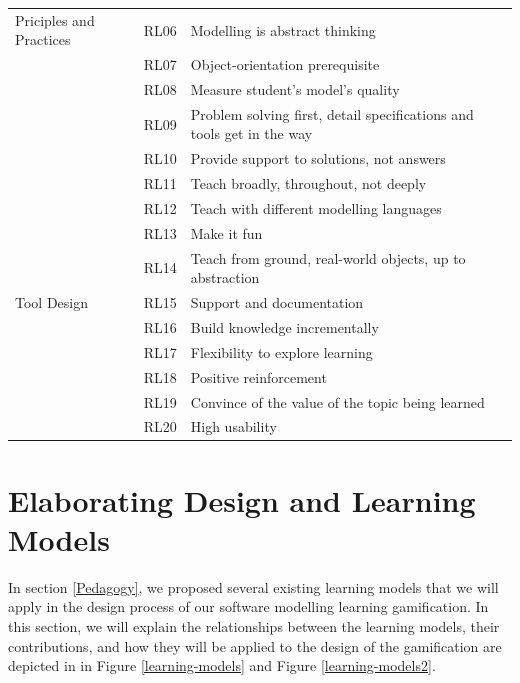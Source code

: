 \documentclass[12pt, a4paper]{report}
\begin{document}
{\begin{table}[ht]
\begin{center}
\begin{tabular}{ p{2cm}p{1cm}p{10cm} }
\hline
\multirow{1}{2cm}{Priciples and Practices} 
& RL06 & Modelling is abstract thinking \\ 
& RL07 & Object-orientation prerequisite \\
& RL08 & Measure student's model's quality \\
& RL09 & Problem solving first, detail specifications and tools get in the way \\
& RL10 & Provide support to solutions, not answers \\ 
& RL11 & Teach broadly, throughout, not deeply \\
& RL12 & Teach with different modelling languages \\ 
& RL13 & Make it fun \\ 
& RL14 & Teach from ground, real-world objects, up to abstraction \\ 

\hline
\multirow{1}{2cm}{Tool Design}
& RL15 & Support and documentation \\
& RL16 & Build knowledge incrementally \\
& RL17 & Flexibility to explore learning \\
& RL18 & Positive reinforcement \\
& RL19 & Convince of the value of the topic being learned \\ 
& RL20 & High usability \\ 
\hline
\end{tabular}
\end{center}
\end{table}

\section{Elaborating Design and Learning Models}
\label{Elaborating Design and Learning Models}
In section \ref{Pedagogy}, we proposed several existing learning models that we will apply in the design process of our software modelling learning gamification. In this section, we will explain the relationships between the learning models, their contributions, and how they will be applied to the design of the gamification are depicted in in Figure \ref{learning-models} and Figure \ref{learning-models2}.

}
\end{document}
